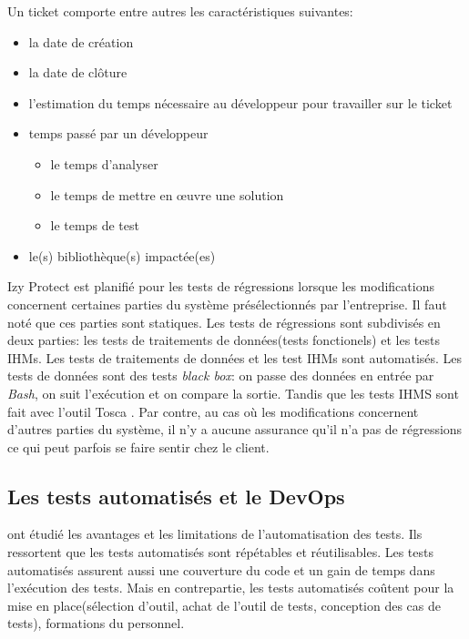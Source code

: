 \documentclass[a4paper]{article}
\begin{document}
Un ticket comporte entre autres les caractéristiques suivantes:

\begin{itemize}
\item la date de création
\item la date de clôture
\item l'estimation du temps nécessaire au développeur pour travailler sur le ticket
\item temps passé par un développeur
\begin{itemize}
\item le temps d'analyser
\item le temps de mettre en œuvre une solution
\item le temps de test
\end{itemize}
\item le(s) bibliothèque(s) impactée(es)
\end{itemize}

Izy Protect  est planifié pour les tests de régressions lorsque  les modifications concernent certaines parties du système présélectionnés par l'entreprise.
Il faut noté que ces parties sont statiques.
Les tests de régressions sont subdivisés en deux parties: les tests de traitements de données(tests fonctionels) et les tests IHMs.
Les tests de traitements de données et les test IHMs sont automatisés.
Les tests de données sont des tests \textit{black box}: on passe des données en entrée par \textit{Bash}, on suit l'exécution et on compare la sortie. 
Tandis que les tests IHMS sont fait avec l'outil Tosca \cite{tosca}. 
Par contre, au cas où les modifications concernent d'autres parties du système, il n'y a aucune assurance qu'il n'a  pas de régressions ce qui peut parfois se faire sentir chez le client.

\subsection{Les tests automatisés et le DevOps}

\citet{Dude12a}  ont étudié les avantages et les limitations de l'automatisation des tests.
Ils ressortent que  les tests automatisés sont  répétables et réutilisables.
Les tests automatisés assurent aussi une couverture du code et un gain de temps dans l'exécution des tests.
Mais en contrepartie, les tests automatisés coûtent pour la mise en place(sélection d'outil, achat de l'outil de tests, conception des cas de tests), formations du personnel.
\end{document}
